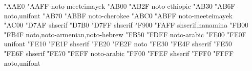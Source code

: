 \documentclass{article}
\begin{document}
                        {  "AAE0} {  "AAFF} {noto-meeteimayek}
                            {  "AB00} {  "AB2F} {noto-ethiopic}
                               {  "AB30} {  "AB6F} {noto,unifont}
                            {  "AB70} {  "ABBF} {noto-cherokee}
                                   {  "ABC0} {  "ABFF} {noto-meeteimayek}
                               {  "AC00} {  "D7AF} {shserif}
                         {  "D7B0} {  "D7FF} {shserif}
                   {  "F900} {  "FAFF} {shserif,hanamina}
                  {  "FB00} {  "FB4F} {noto,noto-armenian,noto-hebrew}
                    {  "FB50} {  "FDFF} {noto-arabic}
                            {  "FE00} {  "FE0F} {unifont}
                                 {  "FE10} {  "FE1F} {shserif}
                           {  "FE20} {  "FE2F} {noto}
                        {  "FE30} {  "FE4F} {shserif}
                            {  "FE50} {  "FE6F} {shserif}
                    {  "FE70} {  "FEFF} {noto-arabic}
                  {  "FF00} {  "FFEF} {shserif}
                                       {  "FFF0} {  "FFFF} {noto,unifont}

\end{document}
